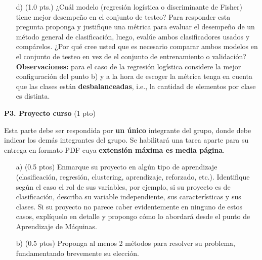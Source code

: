 \documentclass[11pt,letterpaper]{article}
\begin{document}
\begin{enumerate}
\item[d)] (1.0 pts.) ¿Cuál modelo (regresión logística o  discriminante de Fisher) tiene mejor desempeño en el conjunto de testeo? Para responder esta pregunta proponga y justifique una métrica para evaluar el desempeño de un método general de clasificación, luego, evalúe ambos clasificadores usados y compárelos. ¿Por qué cree usted que es necesario comparar ambos modelos en el conjunto de testeo en vez de el conjunto de entrenamiento o validación?
\\\textbf{Observaciones:} para el caso de la regresión logística considere la mejor configuración del punto b) y a la hora de escoger la métrica tenga en cuenta que las clases están \textbf{desbalanceadas}, i.e., la cantidad de elementos por clase es distinta.

\end{enumerate}

\noindent\textbf{P3. Proyecto curso} (1 pto)
\vspace{5mm}


Esta parte debe ser respondida por \textbf{un único} integrante del grupo, donde debe indicar los demás integrantes del grupo. Se habilitará una tarea aparte para su entrega en formato PDF cuya \textbf{extensión máxima es media página}.
\begin{itemize}
    \item[a)] (0.5 ptos) Enmarque su proyecto en algún tipo de aprendizaje (clasificación, regresión, clustering, aprendizaje, reforzado, etc.). Identifique según el caso el rol de sus variables, por ejemplo, si su proyecto es de clasificación, describa su variable independiente, sus características y sus clases. Si su proyecto no parece caber evidentemente en ninguno de estos casos, explíquelo en detalle y propongo cómo lo abordará desde el punto de Aprendizaje de Máquinas.
    \item[b)] (0.5 ptos) Proponga al menos 2 métodos para resolver su problema, fundamentando brevemente su elección.
\end{itemize}
\end{document}
